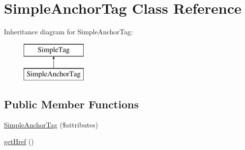 \hypertarget{class_simple_anchor_tag}{
\section{SimpleAnchorTag Class Reference}
\label{class_simple_anchor_tag}
}
Inheritance diagram for SimpleAnchorTag:\begin{figure}[H]
\begin{center}
\leavevmode
\includegraphics[height=2.000000cm]{class_simple_anchor_tag}
\end{center}
\end{figure}
\subsection*{Public Member Functions}
\begin{DoxyCompactItemize}
\item 
\hyperlink{class_simple_anchor_tag_accc4f2fb09248fb378e105ffbab05b05}{SimpleAnchorTag} (\$attributes)
\item 
\hyperlink{class_simple_anchor_tag_ab615c7ca908f359651e6ee57da006e56}{getHref} ()
\end{DoxyCompactItemize}


